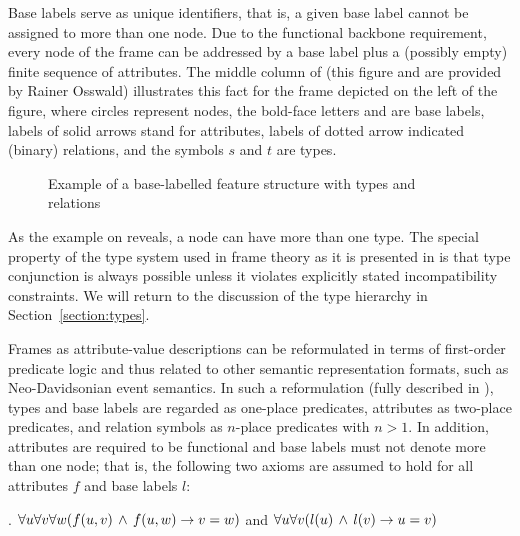 Base labels serve as unique identifiers, that is, a given base label cannot be assigned to more than one node. Due to the functional backbone requirement, every node of the frame can be addressed by a base label
plus a (possibly empty) finite sequence of attributes.
The middle column of  (this figure and  are provided by Rainer Osswald) illustrates this fact
for the frame depicted on the left of the figure, where circles
represent nodes, the bold-face letters  and  are base
labels, labels of solid arrows stand for attributes, labels of dotted arrow
indicated (binary) relations, and the symbols $s$ and $t$ are types.\largerpage

\begin{figure}
%
\caption{Example of a base-labelled feature structure with types and relations\label{fig-frame-example}}
\end{figure}

As the example on  reveals, a node can have more than one type. The special property of the type system used in frame theory as it is presented in \citealt{KallmeyerOsswald:13} is that type conjunction  is always possible unless it violates explicitly stated incompatibility constraints. We will return to the discussion of the type hierarchy in Section~\ref{section:types}.

Frames as attribute-value descriptions can be reformulated in terms of first-order predicate logic and thus related to other semantic representation formats, such as Neo-Davidsonian event semantics. In such a reformulation (fully described in \citealt[Section~3.3.3]{KallmeyerOsswald:13}), types and base
labels are regarded as one-place predicates, attributes as two-place predicates, and relation symbols as $n$-place predicates with $n>1$.
In addition, attributes are required to be functional and base labels must
not denote more than one node;
that is, the following two axioms are assumed to hold for all
attributes $f$ and base labels $l$:

\ex.\label{ex.fun-axioms}
$\forall u\forall v\forall w(f(u,v)\,\wedge\, f(u,w)\rightarrow v=w)$
\quad and \quad
$\forall u\forall v(l(u)\,\wedge\, l(v)\rightarrow u=v)$

